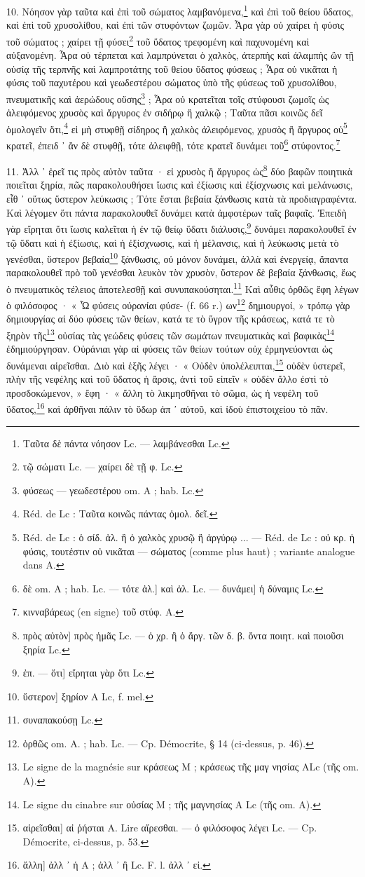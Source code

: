 \documentclass[a4paper, 11pt, oneside, polutonikogreek, french]{article}
\begin{document}
10. Νόησον γὰρ ταῦτα καὶ ἐπὶ τοῦ σώματος λαμβανόμενα,\footnote{Ταῦτα δὲ πάντα νόησον Lc. --- λαμβάνεσθαι Lc.} καὶ ἐπὶ τοῦ θείου ὕδατος, καὶ ἐπὶ τοῦ χρυσολίθου, καὶ ἐπὶ τῶν στυφόντων ζωμῶν. Ἆρα γὰρ οὐ χαίρει ἡ φύσις τοῦ σώματος ; χαίρει τῇ φύσει\footnote{τῷ σώματι Lc. --- χαίρει δὲ τῇ φ. Lc.} τοῦ ὕδατος τρεφομένη καὶ παχυνομένη καὶ αὐξανομένη. Ἆρα οὐ τέρπεται καὶ λαμπρύνεται ὁ χαλκὸς, ἀτερπὴς καὶ ἀλαμπὴς ὢν τῇ οὐσίᾳ τῆς τερπνῆς καὶ λαμπροτάτης τοῦ θείου ὕδατος φύσεως ; Ἆρα οὐ νικᾶται ἡ φύσις τοῦ παχυτέρου καὶ γεωδεστέρου σώματος ὑπὸ τῆς φύσεως τοῦ χρυσολίθου, πνευματικῆς καὶ ἀερώδους οὔσης\footnote{φύσεως --- γεωδεστέρου om. A ; hab. Lc.} ; Ἆρα οὐ κρατεῖται τοῖς στύφουσι ζωμοῖς ὡς ἀλειφόμενος χρυσὸς καὶ ἄργυρος ἐν σιδήρῳ ἢ χαλκῷ ; Ταῦτα πᾶσι κοινῶς δεῖ ὁμολογεῖν ὅτι,\footnote{Réd. de Lc : Ταῦτα κοινῶς πάντας ὁμολ. δεῖ.} εἰ μὴ στυφθῇ σίδηρος ἢ χαλκὸς ἀλειφόμενος, χρυσὸς ἢ ἄργυρος οὐ\footnote{Réd. de Lc : ὁ σίδ. ἀλ. ἢ ὁ χαλκὸς χρυσῷ ἢ ἀργύρῳ ... --- Réd. de Lc : οὐ κρ. ἡ φύσις, τουτέστιν οὐ νικᾶται --- σώματος (comme plus haut) ; variante analogue dans A.} κρατεῖ, ἐπειδ ᾽ ἂν δὲ στυφθῇ, τότε ἀλειφθῇ, τότε κρατεῖ δυνάμει τοῦ\footnote{δὲ om. A ; hab. Lc. --- τότε ἀλ.] καὶ ἀλ. Lc. --- δυνάμει] ἡ δύναμις Lc.} στύφοντος.\footnote{κινναβάρεως (en signe) τοῦ στύφ. A.}

11. Ἀλλ ᾽ ἐρεῖ τις πρὸς αὐτὸν ταῦτα · εἰ χρυσὸς ἢ ἄργυρος ὡς\footnote{πρὸς αὐτὸν] πρὸς ἡμᾶς Lc. --- ὁ χρ. ἢ ὁ ἄργ. τῶν δ. β. ὄντα ποιητ. καὶ ποιοῦσι ξηρία Lc.} δύο βαφῶν ποιητικὰ ποιεῖται ξηρία, πῶς παρακολουθήσει ἴωσις καὶ ἐξίωσις καὶ ἐξίσχνωσις καὶ μελάνωσις, εἶθ ᾽ οὕτως ὕστερον λεύκωσις ; Τότε ἔσται βεβαία ξάνθωσις κατὰ τὰ προδιαγραφέντα. Καὶ λέγομεν ὅτι πάντα παρακολουθεῖ δυνάμει κατὰ ἀμφοτέρων ταῖς βαφαῖς. Ἐπειδὴ γὰρ εἴρηται ὅτι ἴωσις καλεῖται ἡ ἐν τῷ θείῳ ὕδατι διάλυσις,\footnote{ἐπ. --- ὅτι] εἴρηται γὰρ ὅτι Lc.} δυνάμει παρακολουθεῖ ἐν τῷ ὕδατι καὶ ἡ ἐξίωσις, καὶ ἡ ἐξίσχνωσις, καὶ ἡ μέλανσις, καὶ ἡ λεύκωσις μετὰ τὸ γενέσθαι, ὕστερον βεβαία\footnote{ὕστερον] ξηρίον A Lc, f. mel.} ξάνθωσις, οὐ μόνον δυνάμει, ἀλλὰ καὶ ἐνεργείᾳ, ἅπαντα παρακολουθεῖ πρὸ τοῦ γενέσθαι λευκὸν τὸν χρυσὸν, ὕστερον δὲ βεβαία ξάνθωσις, ἕως ὁ πνευματικὸς τέλειος ἀποτελεσθῇ καὶ συνυπακούσηται.\footnote{συναπακούσῃ Lc.} Καὶ αὖθις ὀρθῶς ἔφη λέγων ὁ φιλόσοφος · « Ὦ φύσεις οὐρανίαι φύσε- (f. 66 r.) ων\footnote{ὀρθῶς om. A. ; hab. Lc. --- Cp. Démocrite, § 14 (ci-dessus, p. 46).} δημιουργοί, » τρόπῳ γὰρ δημιουργίας αἱ δύο φύσεις τῶν θείων, κατά τε τὸ ὕγρον τῆς κράσεως, κατά τε τὸ ξηρὸν τῆς\footnote{Le signe de la magnésie sur κράσεως M ; κράσεως τῆς μαγ νησίας ALc (τῆς om. A).} οὐσίας τὰς γεώδεις φύσεις τῶν σωμάτων πνευματικὰς καὶ βαφικὰς\footnote{Le signe du cinabre sur οὐσίας M ; τῆς μαγνησίας A Lc (τῆς om. A).} ἐδημιούργησαν. Οὐράνιαι γὰρ αἱ φύσεις τῶν θείων τούτων οὐχ ἑρμηνεύονται ὡς δυνάμεναι αἱρεῖσθαι. Διὸ καὶ ἑξῆς λέγει · « Οὐδὲν ὑπολέλειπται,\footnote{αἱρεῖσθαι] αἰ ῥήσται A. Lire αἴρεσθαι. --- ὁ φιλόσοφος λέγει Lc. --- Cp. Démocrite, ci-dessus, p. 53.} οὐδὲν ὑστερεῖ, πλὴν τῆς νεφέλης καὶ τοῦ ὕδατος ἡ ἄρσις, ἀντὶ τοῦ εἰπεῖν « οὐδὲν ἄλλο ἐστὶ τὸ προσδοκώμενον, » ἔφη · « ἄλλη τὸ λικμησθῆναι τὸ σῶμα, ὡς ἡ νεφέλη τοῦ ὕδατος,\footnote{ἄλλη] ἀλλ ᾽ ἡ A ; ἀλλ ᾽ ἢ Lc. F. l. ἀλλ ᾽ εἰ.} καὶ ἀρθῆναι πάλιν τὸ ὕδωρ ἀπ ᾽ αὐτοῦ, καὶ ἰδοὺ ἐπιστοιχείου τὸ πᾶν.
\end{document}
